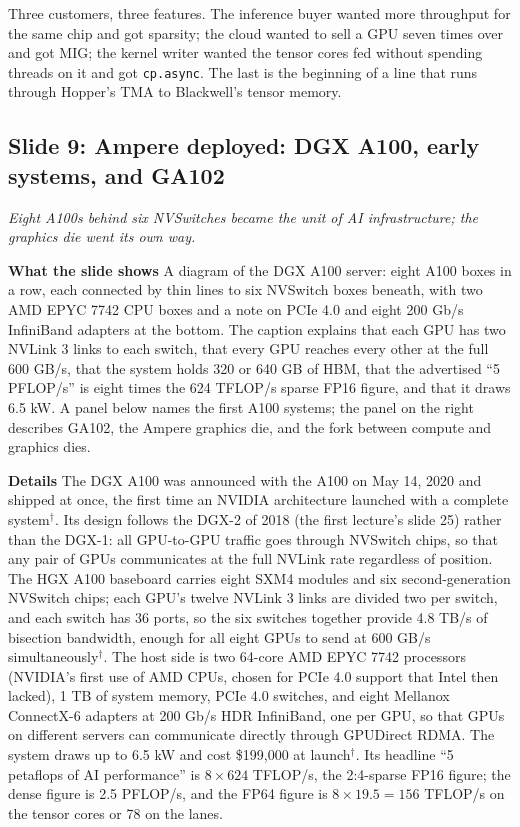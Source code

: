 \documentclass[11pt,letterpaper]{article}
\newcommand{\slide}[3]{%
  \subsection[Slide #1: #2]{Slide #1: #2}%
  {\color{muted}\itshape #3\par}\medskip}
\newcommand{\para}[1]{\medskip\noindent\textbf{#1}\quad}
\newenvironment{intuition}{\begin{tcolorbox}[intuitionbox]}{\end{tcolorbox}}
\begin{document}
\begin{intuition}
Three customers, three features. The inference buyer wanted more throughput for the same chip and got sparsity; the cloud wanted to sell a GPU seven times over and got MIG; the kernel writer wanted the tensor cores fed without spending threads on it and got \texttt{cp.async}. The last is the beginning of a line that runs through Hopper's TMA to Blackwell's tensor memory.
\end{intuition}

\slide{9}{Ampere deployed: DGX A100, early systems, and GA102}{Eight A100s behind six NVSwitches became the unit of AI infrastructure; the graphics die went its own way.}

\para{What the slide shows} A diagram of the DGX A100 server: eight A100 boxes in a row, each connected by thin lines to six NVSwitch boxes beneath, with two AMD EPYC 7742 CPU boxes and a note on PCIe 4.0 and eight 200 Gb/s InfiniBand adapters at the bottom. The caption explains that each GPU has two NVLink 3 links to each switch, that every GPU reaches every other at the full 600 GB/s, that the system holds 320 or 640 GB of HBM, that the advertised ``5 PFLOP/s'' is eight times the 624 TFLOP/s sparse FP16 figure, and that it draws 6.5 kW. A panel below names the first A100 systems; the panel on the right describes GA102, the Ampere graphics die, and the fork between compute and graphics dies.

\para{Details} The DGX A100 was announced with the A100 on May 14, 2020 and shipped at once, the first time an NVIDIA architecture launched with a complete system$^\dagger$. Its design follows the DGX-2 of 2018 (the first lecture's slide 25) rather than the DGX-1: all GPU-to-GPU traffic goes through NVSwitch chips, so that any pair of GPUs communicates at the full NVLink rate regardless of position. The HGX A100 baseboard carries eight SXM4 modules and six second-generation NVSwitch chips; each GPU's twelve NVLink 3 links are divided two per switch, and each switch has 36 ports, so the six switches together provide 4.8 TB/s of bisection bandwidth, enough for all eight GPUs to send at 600 GB/s simultaneously$^\dagger$. The host side is two 64-core AMD EPYC 7742 processors (NVIDIA's first use of AMD CPUs, chosen for PCIe 4.0 support that Intel then lacked), 1 TB of system memory, PCIe 4.0 switches, and eight Mellanox ConnectX-6 adapters at 200 Gb/s HDR InfiniBand, one per GPU, so that GPUs on different servers can communicate directly through GPUDirect RDMA. The system draws up to 6.5 kW and cost \$199,000 at launch$^\dagger$. Its headline ``5 petaflops of AI performance'' is $8 \times 624$ TFLOP/s, the 2:4-sparse FP16 figure; the dense figure is 2.5 PFLOP/s, and the FP64 figure is $8 \times 19.5 = 156$ TFLOP/s on the tensor cores or 78 on the lanes.
\end{document}
